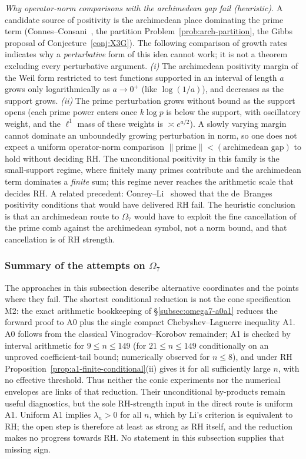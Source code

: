 \documentclass[11pt]{amsart}
\theoremstyle{definition}
\theoremstyle{remark}
\theoremstyle{definition}
\begin{document}
\emph{Why operator-norm comparisons with the archimedean gap fail (heuristic).}  A candidate source
of positivity is the archimedean place dominating the prime term (Connes--Consani~\cite{connesconsani2021},
the partition Problem~\ref{prob:arch-partition}, the Gibbs proposal of Conjecture~\ref{conj:X3G}).
The following comparison of growth rates indicates why a \emph{perturbative} form of this idea cannot
work; it is not a theorem excluding every perturbative argument.
\emph{(i)} The archimedean positivity margin of the Weil form restricted to test functions supported
in an interval of length $a$ grows only logarithmically as $a\to0^+$ (like $\log(1/a)$), and
decreases as the support grows.  \emph{(ii)} The prime perturbation grows without bound
as the support opens (each prime power enters once $k\log p$ is below the support, with oscillatory
weight, and the $\ell^1$ mass of these weights is $\asymp e^{a/2}$).  A slowly varying margin cannot
dominate an unboundedly growing perturbation in norm, so one does not expect a uniform operator-norm
comparison $\|\text{prime}\|<(\text{archimedean gap})$ to hold without deciding RH.  The
unconditional positivity in this family is the small-support regime, where finitely many primes
contribute and the archimedean term dominates a \emph{finite} sum; this regime never reaches the
arithmetic scale that decides RH.  A related precedent: Conrey--Li~\cite{ConreyLi} showed that the
de~Branges positivity conditions that would have delivered RH fail.  The heuristic conclusion is that
an archimedean route to $\Omega_7$ would have to exploit the fine cancellation of the prime comb against
the archimedean symbol, not a norm bound, and that cancellation is of RH strength.


\subsubsection*{Summary of the attempts on \texorpdfstring{$\Omega_7$}{Omega7}}

The approaches in this subsection describe alternative coordinates and the points where they
fail.  The shortest conditional reduction is not the cone specification M2: the exact arithmetic
bookkeeping of \S\ref{subsec:omega7-a0a1} reduces the forward proof to A0 plus the single compact
Chebyshev--Laguerre inequality A1.  A0 follows from the classical Vinogradov--Korobov remainder; A1 is
checked by interval arithmetic for $9\le n\le149$ (for $21\le n\le149$ conditionally on an unproved
coefficient-tail bound; numerically observed for $n\le8$), and under RH
Proposition~\ref{prop:a1-finite-conditional}(ii) gives it for all sufficiently large $n$, with no
effective threshold.  Thus neither the conic experiments nor the numerical envelopes are links of that reduction.  Their unconditional by-products remain useful diagnostics, but the sole
RH-strength input in the direct route is uniform A1.  Uniform A1 implies $\lambda_n>0$ for all
$n$, which by Li's criterion is equivalent to RH; the open step is therefore at least as strong as RH
itself, and the reduction makes no progress towards RH.  No statement in this subsection supplies
that missing sign.
\end{document}
